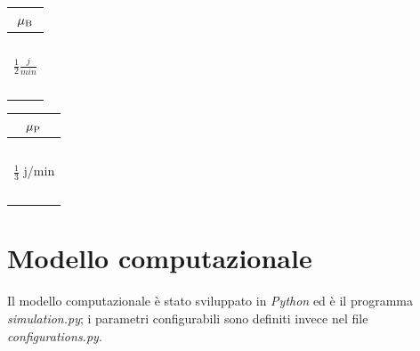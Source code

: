 \documentclass[a4paper, 12pt]{article}
\begin{document}
\begin{itemize}
    \begin{table}[!htb]
        \begin{minipage}{.5\linewidth}
          \centering
            \begin{tabular}{ |c| }
              \hline
              \cellcolor{cellcolor}$\mu{\textsubscript{B}}$ \\
              \hline
              \hline
              \ \\
              $\frac{1}{2} \frac{j}{min}$ \\
              \ \\
              \hline
            \end{tabular}
        \end{minipage}
        \begin{minipage}{.5\linewidth}
          \centering
          \begin{tabular}{ |c| }
            \hline
            \cellcolor{cellcolor}$\mu{\textsubscript{P}}$ \\
            \hline
            \hline
            \ \\
            $\frac{1}{3}$ j/min \\
            \ \\
            \hline
          \end{tabular}
        \end{minipage} 
    \end{table}
\end{itemize}

\newpage
\section{Modello computazionale}
Il modello computazionale è stato sviluppato in \emph{Python} ed è il programma
\emph{simulation.py}; i parametri configurabili sono definiti invece nel file
\emph{configurations.py}.  
\end{document}
